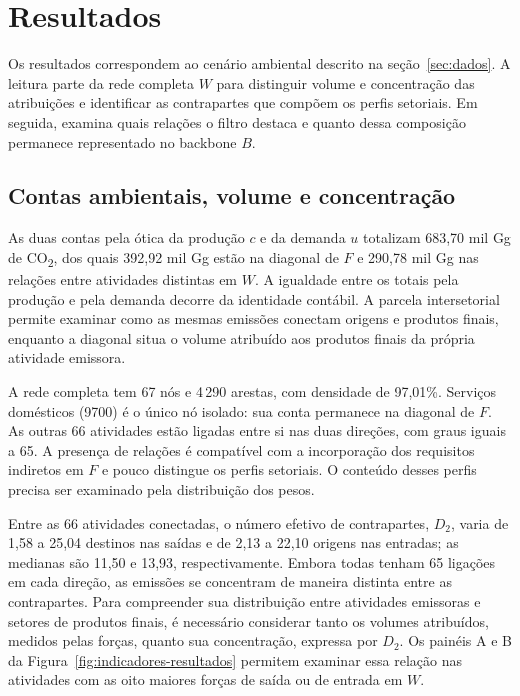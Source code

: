 \section{Resultados}
\label{sec:resultados}

Os resultados correspondem ao cenário ambiental descrito na seção~\ref{sec:dados}. A leitura parte da rede completa $W$ para distinguir volume e concentração das atribuições e identificar as contrapartes que compõem os perfis setoriais. Em seguida, examina quais relações o filtro destaca e quanto dessa composição permanece representado no backbone $B$.

\subsection{Contas ambientais, volume e concentração}

As duas contas pela ótica da produção $c$ e da demanda $u$ totalizam 683,70 mil Gg de CO\textsubscript{2}, dos quais 392,92 mil Gg estão na diagonal de $F$ e 290,78 mil Gg nas relações entre atividades distintas em $W$. A igualdade entre os totais pela produção e pela demanda decorre da identidade contábil. A parcela intersetorial permite examinar como as mesmas emissões conectam origens e produtos finais, enquanto a diagonal situa o volume atribuído aos produtos finais da própria atividade emissora.

A rede completa tem 67 nós e 4\,290 arestas, com densidade de 97,01\%. Serviços domésticos (9700) é o único nó isolado: sua conta permanece na diagonal de $F$. As outras 66 atividades estão ligadas entre si nas duas direções, com graus iguais a 65. A presença de relações é compatível com a incorporação dos requisitos indiretos em $F$ e pouco distingue os perfis setoriais. O conteúdo desses perfis precisa ser examinado pela distribuição dos pesos.

Entre as 66 atividades conectadas, o número efetivo de contrapartes, $D_2$, varia de 1,58 a 25,04 destinos nas saídas e de 2,13 a 22,10 origens nas entradas; as medianas são 11,50 e 13,93, respectivamente. Embora todas tenham 65 ligações em cada direção, as emissões se concentram de maneira distinta entre as contrapartes. Para compreender sua distribuição entre atividades emissoras e setores de produtos finais, é necessário considerar tanto os volumes atribuídos, medidos pelas forças, quanto sua concentração, expressa por $D_2$. Os painéis A e B da Figura~\ref{fig:indicadores-resultados} permitem examinar essa relação nas atividades com as oito maiores forças de saída ou de entrada em $W$.

